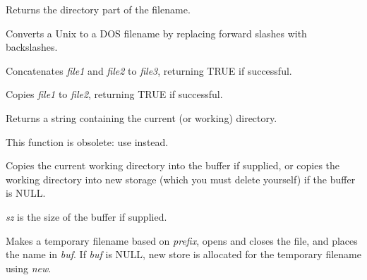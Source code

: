 

Returns the directory part of the filename.



Converts a Unix to a DOS filename by replacing forward
slashes with backslashes.



Concatenates {\it file1} and {\it file2} to {\it file3}, returning
TRUE if successful.



Copies {\it file1} to {\it file2}, returning TRUE if successful.

\label{wxgetcwd}


Returns a string containing the current (or working) directory.



This function is obsolete: use  instead.

Copies the current working directory into the buffer if supplied, or
copies the working directory into new storage (which you must delete yourself)
if the buffer is NULL.

{\it sz} is the size of the buffer if supplied.




Makes a temporary filename based on {\it prefix}, opens and closes the file,
and places the name in {\it buf}. If {\it buf} is NULL, new store
is allocated for the temporary filename using {\it new}.

